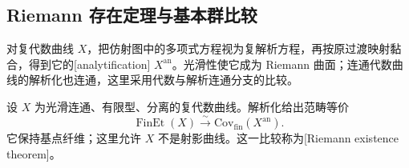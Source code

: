 \subsection{Riemann 存在定理与基本群比较}
\label{b3:subsec:I03:03}

对复代数曲线 \(X\)，把仿射图中的多项式方程视为复解析方程，再按原过渡映射黏合，得到它的[analytification] \(X^{\mathrm{an}}\)。光滑性使它成为 Riemann 曲面；连通代数曲线的解析化也连通，这里采用代数与解析连通分支的比较\cite[Exposé XII, Corollaire 2.6, p. 244]{SGA12003}。

\begin{theorem}\label{b3:thm:I-riemann-existence}
	设 \(X\) 为光滑连通、有限型、分离的复代数曲线。解析化给出范畴等价
	\[
		\operatorname{FinEt}(X)
		\xrightarrow{\ \sim\ }
		\mathrm{Cov}_{\mathrm{fin}}(X^{\mathrm{an}}).
	\]
	它保持基点纤维；这里允许 \(X\) 不是射影曲线。这一比较称为[Riemann existence theorem]。
\end{theorem}
